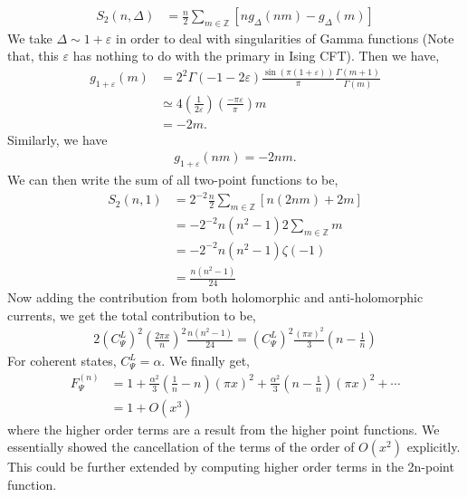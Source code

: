 \documentclass[11pt]{article}
\newcommand{\lb}{\left(}
\newcommand{\rb}{\right)}
\begin{document}
\begin{align}
    S_2(n,\Delta) &= \frac{n}{2}\sum_{m\in \mathbb{Z}} \left[ng_\Delta(nm) - g_\Delta(m)\right] 
\end{align}
We take $\Delta \sim 1+\varepsilon$ in order to deal with singularities of Gamma functions (Note that, this $\varepsilon$ has nothing to do with the primary in Ising CFT). Then we have,
\begin{align}
    g_{1+\varepsilon}(m) &= 2^2 \Gamma(-1-2\varepsilon)\frac {\sin(\pi (1+\varepsilon))}{\pi}\frac{\Gamma (m+1)}{\Gamma(m)} 
    \\
    &\simeq 4 \lb \frac{1}{2\varepsilon} \rb \lb \frac{-\pi \varepsilon}{\pi}\rb m \\
    &= -2m .
\end{align}
Similarly, we have
\begin{align}
    g_{1+\varepsilon}(nm) = -2nm.
\end{align}
We can then write the sum of all two-point functions to be,
\begin{align}
    S_2(n,1) &= 2^{-2}\frac{n}{2}\sum_{m\in \mathbb{Z}} \left[ n(2nm) + 2m \right]\\
    &= -2^{-2}n(n^2-1) 2\sum_{m\in \mathbb{Z}} m \\
    &= -2^{-2}n(n^2 - 1) \zeta(-1) \\
    &= \frac{n(n^2-1)}{24}
\end{align}
Now adding the contribution from both holomorphic and anti-holomorphic currents, we get the total contribution to be,
\begin{align}
    2{(C_\Psi^L)}^2 \lb\frac{2\pi x}{n}\rb^2 \frac{n(n^2-1)}{24} = {(C_\Psi^L)}^2\frac{(\pi x)^2}{3} \lb n-\frac{1}{n}\rb
\end{align}
For coherent states, $C_\Psi^L = \alpha$. We finally get, 
\begin{align}
    F_\Psi^{(n)} &= 1+ \frac{\alpha^2}{3} \lb\frac{1}{n}-n\rb (\pi x)^2 + \frac{\alpha^2}{3}\lb n-\frac{1}{n}\rb(\pi x)^2 +  \cdots\\
    &= 1 + O(x^3)
\end{align}
where the higher order terms are a result from the higher point functions. We essentially showed the cancellation of the terms of the order of $O(x^2)$ explicitly. This could be further extended by computing higher order terms in the 2n-point function. 
\end{document}
